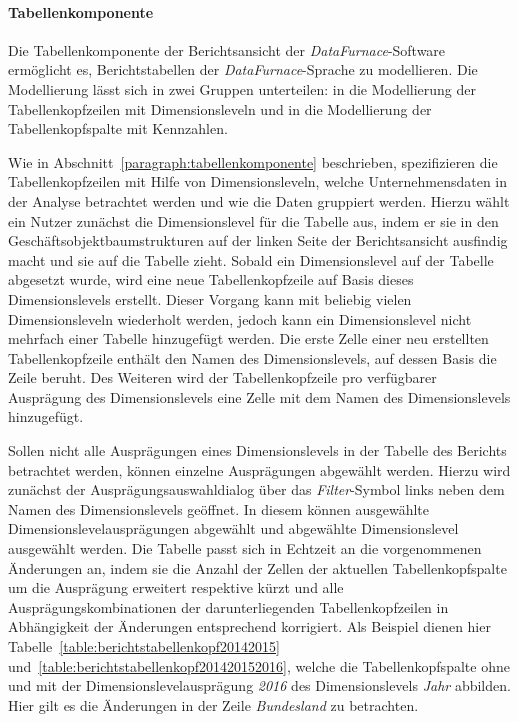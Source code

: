 \documentclass[
  language=german, %
  type=bachelor,%
  ngerman
]{isthesis}
\begin{document}
\begin{content}
  \paragraph{Tabellenkomponente}

  Die Tabellenkomponente der Berichtsansicht der \textit{DataFurnace}-Software
  ermöglicht es, Berichtstabellen der \textit{DataFurnace}-Sprache zu
  modellieren. Die Modellierung lässt sich in zwei Gruppen unterteilen: in die
  Modellierung der Tabellenkopfzeilen mit Dimensionsleveln und in die
  Modellierung der Tabellenkopfspalte mit Kennzahlen.

  Wie in Abschnitt~\ref{paragraph:tabellenkomponente} beschrieben,
  spezifizieren die Tabellenkopfzeilen mit Hilfe von Dimensionsleveln, welche
  Unternehmensdaten in der Analyse betrachtet werden und wie die Daten
  gruppiert werden. Hierzu wählt ein Nutzer zunächst die Dimensionslevel für
  die Tabelle aus, indem er sie in den Geschäftsobjektbaumstrukturen auf der
  linken Seite der Berichtsansicht ausfindig macht und sie auf die Tabelle
  zieht. Sobald ein Dimensionslevel auf der Tabelle abgesetzt wurde, wird eine
  neue Tabellenkopfzeile auf Basis dieses Dimensionslevels erstellt. Dieser
  Vorgang kann mit beliebig vielen Dimensionsleveln wiederholt werden, jedoch
  kann ein Dimensionslevel nicht mehrfach einer Tabelle hinzugefügt werden. Die
  erste Zelle einer neu erstellten Tabellenkopfzeile enthält den Namen des
  Dimensionslevels, auf dessen Basis die Zeile beruht. Des Weiteren wird der
  Tabellenkopfzeile pro verfügbarer Ausprägung des Dimensionslevels eine Zelle
  mit dem Namen des Dimensionslevels hinzugefügt.

  Sollen nicht alle Ausprägungen eines Dimensionslevels in der Tabelle des
  Berichts betrachtet werden, können einzelne Ausprägungen abgewählt werden.
  Hierzu wird zunächst der Ausprägungsauswahldialog über das
  \textit{Filter}-Symbol links neben dem Namen des Dimensionslevels geöffnet.
  In diesem können ausgewählte Dimensionslevelausprägungen abgewählt und abgewählte
  Dimensionslevel ausgewählt werden. Die Tabelle passt sich in Echtzeit an die
  vorgenommenen Änderungen an, indem sie die Anzahl der Zellen der aktuellen
  Tabellenkopfspalte um die Ausprägung erweitert respektive kürzt und alle
  Ausprägungskombinationen der darunterliegenden Tabellenkopfzeilen in
  Abhängigkeit der Änderungen entsprechend korrigiert. Als Beispiel dienen hier
  Tabelle~\ref{table:berichtstabellenkopf20142015}
  und~\ref{table:berichtstabellenkopf201420152016}, welche die Tabellenkopfspalte
  ohne und mit der Dimensionslevelausprägung \textit{2016} des Dimensionslevels
  \textit{Jahr} abbilden. Hier gilt es die Änderungen in der Zeile
  \textit{Bundesland} zu betrachten.


\end{content}
\end{document}
